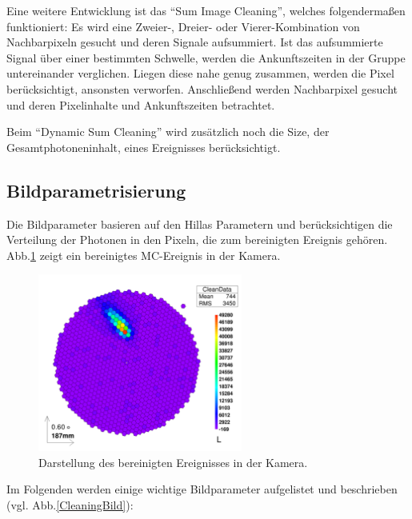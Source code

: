 Eine weitere Entwicklung ist das ``Sum Image Cleaning'', welches folgendermaßen funktioniert:
Es wird eine Zweier-, Dreier- oder Vierer-Kombination von Nachbarpixeln gesucht und deren Signale aufsummiert.
Ist das aufsummierte Signal über einer bestimmten Schwelle, werden die Ankunftszeiten in der Gruppe untereinander verglichen. 
Liegen diese nahe genug zusammen, werden die Pixel berücksichtigt, ansonsten verworfen.
Anschließend werden Nachbarpixel gesucht und deren Pixelinhalte und Ankunftszeiten betrachtet.

Beim ``Dynamic Sum Cleaning'' wird zusätzlich noch die Size, der Gesamtphotoneninhalt, eines Ereignisses berücksichtigt.

\subsection{Bildparametrisierung}
Die Bildparameter basieren auf den Hillas Parametern \cite{Hillas} und berücksichtigen die Verteilung der Photonen in den Pixeln, die zum bereinigten Ereignis gehören.
Abb.\ref{Kamera-Bild-gecleant} zeigt ein bereinigtes MC-Ereignis in der Kamera.

\begin{figure}
    \centering
    \includegraphics[width=0.6\textwidth]{./Plots/03_MonteCarlos/Signal_gecleant_fertig.png}
    \caption{Darstellung des bereinigten Ereignisses in der Kamera.}
    \label{Kamera-Bild-gecleant}
\end{figure}


Im Folgenden werden einige wichtige Bildparameter aufgelistet und beschrieben (vgl. Abb.\ref{CleaningBild}):

